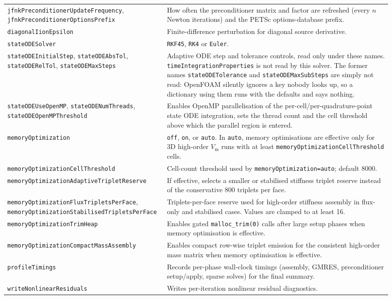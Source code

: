 \documentclass[11pt,a4paper]{article}
\newcommand{\code}[1]{\texttt{\small #1}}
\newcommand{\Vm}{V_{\text{m}}}
\begin{document}
\begin{longtable}{@{}p{0.34\linewidth}p{0.58\linewidth}@{}}
\code{jfnkPreconditionerUpdateFrequency}, \code{jfnkPreconditionerOptionsPrefix} & How often the preconditioner matrix and factor are refreshed (every $n$ Newton iterations) and the PETSc options-database prefix. \\
\code{diagonalIionEpsilon} & Finite-difference perturbation for diagonal source derivative. \\
\code{stateODESolver} & \code{RKF45}, \code{RK4} or \code{Euler}. \\
\code{stateODEInitialStep}, \code{stateODEAbsTol}, \code{stateODERelTol}, \code{stateODEMaxSteps} & Adaptive ODE step and tolerance controls, read only under these names. \code{timeIntegrationProperties} is not read by this solver. The former names \code{stateODETolerance} and \code{stateODEMaxSubSteps} are simply not read: OpenFOAM silently ignores a key nobody looks up, so a dictionary using them runs with the defaults and says nothing. \\
\code{stateODEUseOpenMP}, \code{stateODENumThreads}, \code{stateODEOpenMPThreshold} & Enables OpenMP parallelisation of the per-cell/per-quadrature-point state ODE integration, sets the thread count and the cell threshold above which the parallel region is entered. \\
\code{memoryOptimization} & \code{off}, \code{on}, or \code{auto}. In \code{auto}, memory optimisations are effective only for 3D high-order $\Vm$ runs with at least \code{memoryOptimizationCellThreshold} cells. \\
\code{memoryOptimizationCellThreshold} & Cell-count threshold used by \code{memoryOptimization=auto}; default 8000. \\
\code{memoryOptimizationAdaptiveTripletReserve} & If effective, selects a smaller or stabilised stiffness triplet reserve instead of the conservative 800 triplets per face. \\
\code{memoryOptimizationFluxTripletsPerFace}, \code{memoryOptimizationStabilisedTripletsPerFace} & Triplets-per-face reserve used for high-order stiffness assembly in flux-only and stabilised cases. Values are clamped to at least 16. \\
\code{memoryOptimizationTrimHeap} & Enables gated \code{malloc\_trim(0)} calls after large setup phases when memory optimisation is effective. \\
\code{memoryOptimizationCompactMassAssembly} & Enables compact row-wise triplet emission for the consistent high-order mass matrix when memory optimisation is effective. \\
\code{profileTimings} & Records per-phase wall-clock timings (assembly, GMRES, preconditioner setup/apply, sparse solves) for the final summary. \\
\code{writeNonlinearResiduals} & Writes per-iteration nonlinear residual diagnostics. \\
\bottomrule
\end{longtable}
\end{document}
